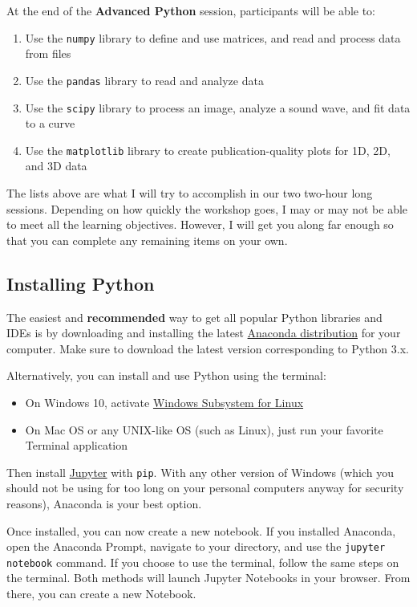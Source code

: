 \documentclass[12pt]{article}
\newcommand{\code}{\texttt}
\begin{document}
At the end of the \textbf{Advanced Python} session, participants will be able to:

\begin{enumerate}
	\item Use the \code{numpy} library to define and use matrices, and read and process data from files
	\item Use the \code{pandas} library to read and analyze data
	\item Use the \code{scipy} library to process an image, analyze a sound wave, and fit data to a curve
	\item Use the \code{matplotlib} library to create publication-quality plots for 1D, 2D, and 3D data
\end{enumerate}

The lists above are what I will try to accomplish in our two two-hour long sessions. Depending on how quickly the workshop goes, I may or may not be able to meet all the learning objectives. However, I will get you along far enough so that you can complete any remaining items on your own.

\subsection{Installing Python}
The easiest and \textbf{recommended} way to get all popular Python libraries and IDEs is by downloading and installing the latest \href{https://www.anaconda.com/distribution/}{Anaconda distribution} for your computer. Make sure to download the latest version corresponding to Python 3.x.

Alternatively, you can install and use Python using the terminal: 

\begin{itemize}
	\item On Windows 10, activate \href{https://docs.microsoft.com/en-us/windows/wsl/install-win10}{Windows Subsystem for Linux}
	\item On Mac OS or any UNIX-like OS (such as Linux), just run your favorite Terminal application
\end{itemize}

Then install \href{https://jupyter.org/install}{Jupyter} with \code{pip}. With any other version of Windows (which you should not be using for too long on your personal computers anyway for security reasons), Anaconda is your best option.

Once installed, you can now create a new notebook. If you installed Anaconda, open the Anaconda Prompt, navigate to your directory, and use the \code{jupyter notebook} command. If you choose to use the terminal, follow the same steps on the terminal. Both methods will launch Jupyter Notebooks in your browser. From there, you can create a new Notebook.
\end{document}
